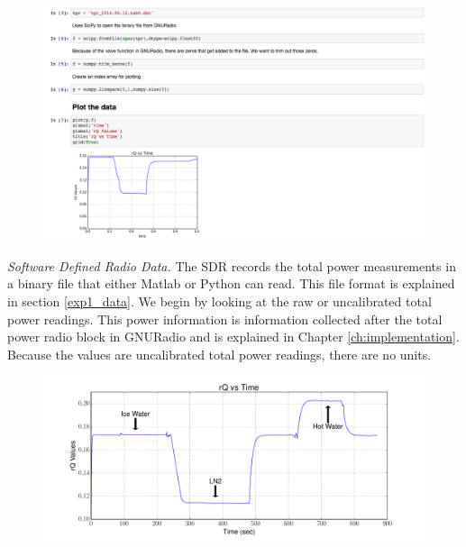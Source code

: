 {\begin{figure}[h!tb] 
\centering
\includegraphics[width=17cm]{Images/python_gnuradio.png}
\label{matlab_display}
\end{figure}

\emph{Software Defined Radio Data.}  The SDR records the total power measurements in a binary file that either Matlab or Python can read.  This file format is explained in section \ref{exp1_data}.  We begin by looking at the raw or uncalibrated total power readings.  This power information is information collected after the total power radio block in GNURadio and is explained in Chapter \ref{ch:implementation}.  Because the values are uncalibrated total power readings, there are no units.

\begin{figure}[h!tb] \centering

\includegraphics[width=\textwidth]{Experiments/Exp1/rqvstime_annotate.pdf}
\label{SDR_rQ}
\end{figure}

}
